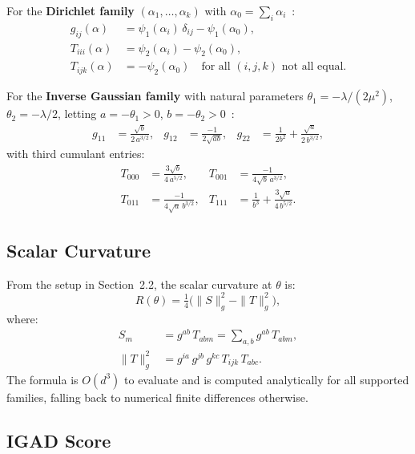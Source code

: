 \documentclass[12pt]{article}
\begin{document}
For the \textbf{Dirichlet family} $(\alpha_1,\ldots,\alpha_k)$ with
$\alpha_0=\sum_i\alpha_i$~\cite{minka2000}:
\begin{align}
  g_{ij}(\alpha) &= \psi_1(\alpha_i)\,\delta_{ij} - \psi_1(\alpha_0),
  \label{eq:dir-metric} \\
  T_{iii}(\alpha) &= \psi_2(\alpha_i) - \psi_2(\alpha_0),
  \label{eq:dir-T-diag} \\
  T_{ijk}(\alpha) &= -\psi_2(\alpha_0)
  \quad\text{for all $(i,j,k)$ not all equal.}
  \label{eq:dir-T-offdiag}
\end{align}

For the \textbf{Inverse Gaussian family} with natural parameters
$\theta_1 = -\lambda/(2\mu^2)$, $\theta_2 = -\lambda/2$, letting
$a = -\theta_1 > 0$, $b = -\theta_2 > 0$~\cite{folks1978,tweedie1957}:
\begin{align}
  g_{11} &= \frac{\sqrt{b}}{2\,a^{3/2}}, &
  g_{12} &= \frac{-1}{2\sqrt{ab}}, &
  g_{22} &= \frac{1}{2b^2} + \frac{\sqrt{a}}{2\,b^{3/2}},
  \label{eq:ig-metric}
\end{align}
with third cumulant entries:
\begin{align}
  T_{000} &= \frac{3\sqrt{b}}{4\,a^{5/2}}, &
  T_{001} &= \frac{-1}{4\sqrt{b}\,a^{3/2}}, \nonumber\\
  T_{011} &= \frac{-1}{4\sqrt{a}\,b^{3/2}}, &
  T_{111} &= \frac{1}{b^3} + \frac{3\sqrt{a}}{4\,b^{5/2}}.
  \label{eq:ig-T}
\end{align}

\subsection{Scalar Curvature}
\label{sec:curvature}

From the setup in Section~2.2, the scalar curvature at $\theta$ is:
\begin{equation}
  R(\theta) = \tfrac{1}{4}\bigl(\|S\|^2_g - \|T\|^2_g\bigr),
  \label{eq:curvature}
\end{equation}
where:
\begin{align*}
  S_m &= g^{ab}\,T_{abm} = \textstyle\sum_{a,b} g^{ab}\,T_{abm},\\
  \|T\|^2_g &= g^{ia}\,g^{jb}\,g^{kc}\,T_{ijk}\,T_{abc}.
\end{align*}
The formula is $O(d^3)$ to evaluate and is computed analytically for all
supported families, falling back to numerical finite differences otherwise.

\subsection{IGAD Score}
\label{sec:score}
\end{document}
